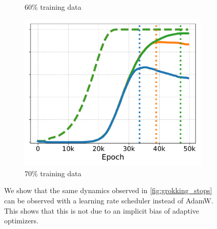 \begin{figure}[t]
\begin{subfigure}{.32\textwidth}
  \caption{60\% training data}
  \label{fig:grokking_stops_60_lr_sch}
\end{subfigure}
\hfill
\begin{subfigure}{.32\textwidth}
  \centering
  \includegraphics[width=\linewidth]{grokking_iclr_arxiv/figures/float32vsfloat64_70_percent_lr_sch.pdf}
  \caption{70\% training data}
\end{subfigure}
\caption{We show that the same dynamics observed in \cref{fig:grokking_stops} can be observed with a learning rate scheduler instead of AdamW. This shows that this is not due to an implicit bias of adaptive optimizers.}
\label{fig:grokking_stops_lr_sch}
\vspace{-5mm}
\end{figure}

\vspace{-5mm}

